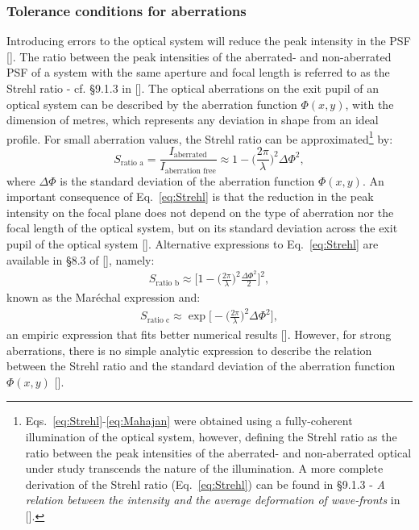 \begin{refsection}
\subsubsection*{Tolerance conditions for aberrations}

Introducing errors to the optical system will reduce the peak intensity in the PSF [\cite[\textit{\S8.2}]{Mahajan2011}]. The ratio between the peak intensities of the aberrated- and non-aberrated PSF of a system with the same aperture and focal length is referred to as the Strehl ratio - cf. \S9.1.3 in [\cite{born_wolf1999}]. The optical aberrations on the exit pupil of an optical system can be described by the aberration function $\Phi(x,y)$, with the dimension of metres, which represents any deviation in shape from an ideal profile. For small aberration values, the Strehl ratio can be approximated\footnote{Eqs.~\ref{eq:Strehl}-\ref{eq:Mahajan} were obtained using a fully-coherent illumination of the optical system, however, defining the Strehl ratio as the ratio between the peak intensities of the aberrated- and non-aberrated optical under study transcends the nature of the illumination. A more complete derivation of the Strehl ratio (Eq.~\ref{eq:Strehl}) can be found in \S9.1.3 - \textit{A relation between the intensity and the average deformation of wave-fronts} in [\cite{born_wolf1999}].} by:
\begin{equation}\label{eq:Strehl}
    S_{\text{ratio a}}=\frac{I_{\text{aberrated}}}{I_{\text{aberration free}}}\approx1-\bigg(\frac{2\pi}{\lambda}\bigg)^2\Delta\Phi^2,
\end{equation}{}
where $\Delta\Phi$ is the standard deviation of the aberration function $\Phi(x,y)$. An important consequence of Eq.~\ref{eq:Strehl} is that the reduction in the peak intensity on the focal plane does not depend on the type of aberration nor the focal length of the optical system, but on its standard deviation across the exit pupil of the optical system [\cite{born_wolf1999}]. Alternative expressions to Eq.~\ref{eq:Strehl} are available in \S8.3 of [\cite{Mahajan2011}], namely:
\begin{align}\label{eq:Marechal}
    S_{\text{ratio b}}\approx\bigg[1-\bigg(\frac{2\pi}{\lambda}\bigg)^2\frac{\Delta\Phi^2}{2}\bigg]^2,
\end{align}
known as the Mar\'echal expression and:
\begin{align}\label{eq:Mahajan}
    S_{\text{ratio c}}\approx\exp{\bigg[- \bigg(\frac{2\pi}{\lambda}\bigg)^2\Delta\Phi^2\bigg]},
\end{align}
an empiric expression that fits better numerical results [\cite{Wetherell1980}]. However, for strong aberrations, there is no simple analytic expression to describe the relation between the Strehl ratio and the standard deviation of the aberration function $\Phi(x,y)$ [\cite{Kessler81}]. 


\end{refsection}
